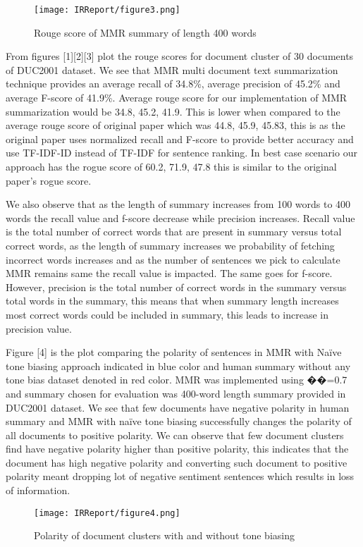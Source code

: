\documentclass[conference]{IEEEtran}
\begin{document}
\begin{figure}[h!]
\centering
\texttt{[image: IRReport/figure3.png]}
\caption{Rouge score of MMR summary of length 400 words}
\label{fig:Result3}
\end{figure}
From figures [1][2][3] plot the rouge scores for document cluster of 30 documents of DUC2001 dataset. We see that MMR multi document text summarization technique provides an average recall of 34.8\%, average precision of 45.2\% and average F-score of 41.9\%. Average rouge score for our implementation of MMR summarization would be {34.8, 45.2, 41.9}. This is lower when compared to the average rouge score of original paper which was {44.8, 45.9, 45.83}, this is as the original paper uses normalized recall and F-score to provide better accuracy and use TF-IDF-ID instead of TF-IDF for sentence ranking. In best case scenario our approach has the rogue score of {60.2, 71.9, 47.8} this is similar to the original paper’s rogue score.
\par
We also observe that as the length of summary increases from 100 words to 400 words the recall value and f-score decrease while precision increases. Recall value is the total number of correct words that are present in summary versus total correct words, as the length of summary increases we probability of fetching incorrect words increases and as the number of sentences we pick to calculate MMR remains same the recall value is impacted. The same goes for f-score. However, precision is the total number of correct words in the summary versus total words in the summary, this means that when summary length increases most correct words could be included in summary, this leads to increase in precision value.
\par
Figure [4] is the plot comparing the polarity of sentences in MMR with Naïve tone biasing approach indicated in blue color and human summary without any tone bias dataset denoted in red color. MMR was implemented using ��=0.7 and summary chosen for evaluation was 400-word length summary provided in DUC2001 dataset. We see that few documents have negative polarity in human summary and MMR with naïve tone biasing successfully changes the polarity of all documents to positive polarity. We can observe that few document clusters find have negative polarity higher than positive polarity, this indicates that the document has high negative polarity and converting such document to positive polarity meant dropping lot of negative sentiment sentences which results in loss of information. 
\begin{figure}[h!]
\centering
\texttt{[image: IRReport/figure4.png]}
\caption{Polarity of document clusters with and without tone biasing}
\label{fig:Result4}
\end{figure}
\end{document}

